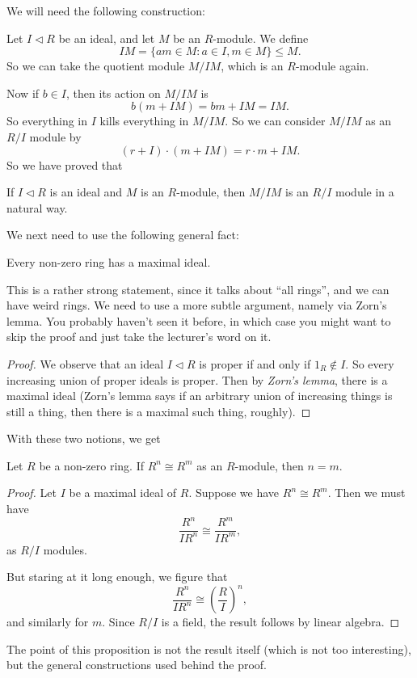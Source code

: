 \documentclass[a4paper]{article}
\begin{document}
We will need the following construction:

Let $I \lhd R$ be an ideal, and let $M$ be an $R$-module. We define
\[
  IM = \{a m \in M: a \in I, m \in M\} \leq M.
\]
So we can take the quotient module $M/IM$, which is an $R$-module again.

Now if $b \in I$, then its action on $M/IM$ is
\[
  b (m + IM) = bm + IM = IM.
\]
So everything in $I$ kills everything in $M/IM$. So we can consider $M/IM$ as an $R/I$ module by
\[
  (r + I)\cdot (m + IM) = r\cdot m + IM.
\]
So we have proved that
\begin{prop}
  If $I\lhd R$ is an ideal and $M$ is an $R$-module, then $M/IM$ is an $R/I$ module in a natural way.
\end{prop}
We next need to use the following general fact:

\begin{prop}
  Every non-zero ring has a maximal ideal.
\end{prop}
This is a rather strong statement, since it talks about ``all rings'', and we can have weird rings. We need to use a more subtle argument, namely via Zorn's lemma. You probably haven't seen it before, in which case you might want to skip the proof and just take the lecturer's word on it.

\begin{proof}
  We observe that an ideal $I \lhd R$ is proper if and only if $1_R \not\in I$. So every increasing union of proper ideals is proper. Then by \emph{Zorn's lemma}, there is a maximal ideal (Zorn's lemma says if an arbitrary union of increasing things is still a thing, then there is a maximal such thing, roughly).
\end{proof}

With these two notions, we get
\begin{prop}
  Let $R$ be a non-zero ring. If $R^n \cong R^m$ as an $R$-module, then $n = m$.
\end{prop}

\begin{proof}
  Let $I$ be a maximal ideal of $R$. Suppose we have $R^n \cong R^m$. Then we must have
  \[
    \frac{R^n}{IR^n} \cong \frac{R^m}{IR^m},
  \]
  as $R/I$ modules.

  But staring at it long enough, we figure that
  \[
    \frac{R^n}{IR^n} \cong \left(\frac{R}{I}\right)^n,
  \]
  and similarly for $m$. Since $R/I$ is a field, the result follows by linear algebra.
\end{proof}
The point of this proposition is not the result itself (which is not too interesting), but the general constructions used behind the proof.
\end{document}
